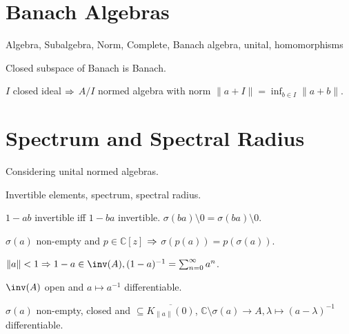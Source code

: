 \documentclass[a4paper, twocolumn, 10pt]{article}
\begin{document}
\pagestyle{empty}

\section{Banach Algebras}

\begin{definition}
    Algebra, Subalgebra, Norm, Complete, Banach algebra, unital, homomorphisms    
\end{definition}

\begin{theorem}
    Closed subspace of Banach is Banach.
\end{theorem}

\begin{theorem}
    $I$ closed ideal $\Rightarrow$ $A/I$ normed algebra with norm $\|a + I\| = \inf_{b \in I} \|a + b\|$.
\end{theorem}

\section{Spectrum and Spectral Radius}

Considering unital normed algebras.

\begin{definition}
    Invertible elements, spectrum, spectral radius.
\end{definition}

\begin{remark}
    $1 - ab$ invertible iff $1 - ba$ invertible. $\sigma(ba) \setminus 0 = \sigma(ba) \setminus 0$.
\end{remark}

\begin{theorem}
    $\sigma(a)$ non-empty and $p \in \mathds{C}[z]$ $\Rightarrow$ $\sigma(p(a)) = p(\sigma(a))$.
\end{theorem}

\begin{theorem}
    $\|a\| < 1 \then 1 - a \in \inv(A), (1-a)^{-1} = \sum_{n=0}^\infty a^n$.
\end{theorem}

\begin{theorem}
    $\inv(A)$ open and $a \mapsto a^{-1}$ differentiable.
\end{theorem}

\begin{theorem}
    $\sigma(a)$ non-empty, closed and $\subseteq \overline{K_{\|a\|}(0)}$, $\mathds{C}\setminus \sigma(a) \to A, \lambda \mapsto (a - \lambda)^{-1}$ differentiable.
\end{theorem}
\end{document}
